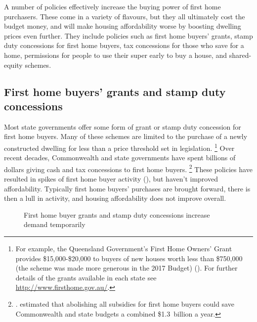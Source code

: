 A number of policies effectively increase the buying power of first home purchasers.
These come in a variety of flavours, but they all ultimately cost the budget money, and will make housing affordability worse by boosting dwelling prices even further.
They include policies such as first home buyers' grants, stamp duty concessions for first home buyers, tax concessions for those who save for a home, permissions for people to use their super early to buy a house, and shared-equity schemes.

\subsection{First home buyers' grants and stamp duty concessions}\label{subsec:first-home-buyers-grants-and-stamp-duty-concessions}

Most state governments offer some form of grant or stamp duty concession for first home buyers.
Many of these schemes are limited to the purchase of a newly constructed dwelling for less than a price threshold set in legislation.%
	\footnote{For example, the Queensland Government's First Home Owners' Grant provides \$15,000-\$20,000 to buyers of new houses worth less than \$750,000 (the scheme was made more generous in the 2017 Budget) (\textcite{Qld-Treasury-2016-First-home-owners-grant}).
	For further details of the grants available in each state see \textcolor{blue}{\url{http://www.firsthome.gov.au/}}.}
Over recent decades, Commonwealth and state governments have spent billions of dollars giving cash and tax concessions to first home buyers.%
	\footnote{\textcite{Eslake2013}. \textcite[][49]{DaleyEtAl-2013-BalancingBudgets-supporting-analysis}
	 estimated that abolishing all subsidies for first home buyers could save Commonwealth and state budgets a combined \$1.3~billion a year.}
These policies have resulted in spikes of first home buyer activity (), but haven't improved affordability. Typically first home buyers' purchases are brought forward, there is then a lull in activity, and housing affordability does not improve overall.

\begin{figure}
\caption{First home buyer grants and stamp duty concessions increase demand temporarily}\label{fig:fhb-grants-fhb-financing}
%
{\textcites{ABSHousingFinanceAustraliaAugust2017}{Blight_2012_FHB_grants}}
\end{figure}

